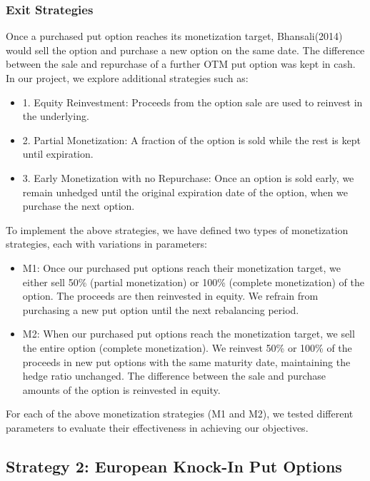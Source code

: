 \documentclass[12pt]{article}
\begin{document}
{{\subsubsection{Exit Strategies}
\qquad Once a purchased put option reaches its monetization target, Bhansali(2014) would sell the option and purchase a new option on the same date. The difference between the sale and repurchase of a further OTM put option was kept in cash. In our project, we explore additional strategies such as:
\begin{itemize}
\item 1. Equity Reinvestment: Proceeds from the option sale are used to reinvest in the underlying.
\item 2. Partial Monetization: A fraction of the option is sold while the rest is kept until expiration.
\item 3. Early Monetization with no Repurchase: Once an option is sold early, we remain unhedged until the original expiration date of the option, when we purchase the next option. 
\end{itemize}
\qquad To implement the above strategies, we have defined two types of monetization strategies, each with variations in parameters:
\begin{itemize}
\item M1: Once our purchased put options reach their monetization target, we either sell 50\% (partial monetization) or 100\% (complete monetization) of the option. The proceeds are then reinvested in equity. We refrain from purchasing a new put option until the next rebalancing period.

\item M2: When our purchased put options reach the monetization target, we sell the entire option (complete monetization). We reinvest 50\% or 100\% of the proceeds in new put options with the same maturity date, maintaining the hedge ratio unchanged. The difference between the sale and purchase amounts of the option is reinvested in equity.

\end{itemize}
\qquad For each of the above monetization strategies (M1 and M2), we tested different parameters to evaluate their effectiveness in achieving our objectives.

\subsection{Strategy 2: European Knock-In Put Options}

}}
\end{document}
